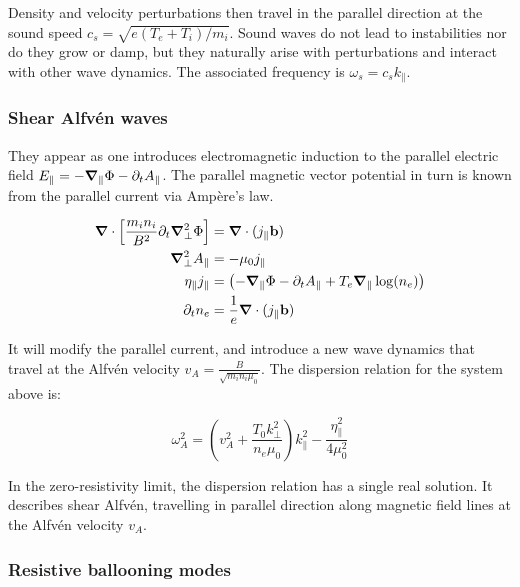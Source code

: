 Density and velocity perturbations then travel in the parallel direction at the sound speed $ c_s = \sqrt{e(T_e + T_i)/m_i} $. Sound waves do not lead to instabilities nor do they grow or damp, but they naturally arise with perturbations and interact with other wave dynamics. The associated frequency is $\omega_s = c_s k_\parallel$.


\subsubsection{Shear Alfvén waves}
\label{ssec:edge_shearAlfvenWaves}

They appear as one introduces electromagnetic induction to the parallel electric field $E_\parallel = -\grad_\parallel \Phi - \partial_t A_\parallel$. The parallel magnetic vector potential in turn is known from the parallel current via Ampère's law.

\begin{align}
	\grad\cdot\left[\frac{m_i n_i}{ B^2}\partial_t\grad^2_\perp\Phi\right] &= \grad\cdot(j_\parallel\mathbf{b}) \\
	\grad^2_\perp A_\parallel &= -\mu_0j_\parallel \\
	\eta_\parallel j_\parallel &= \left(-\grad_\parallel\Phi - \partial_t A_\parallel + T_e\grad_\parallel\log(n_e)\right) \\
	\partial_t n_e &= \frac{1}{e}\grad\cdot (j_\parallel\mathbf{b}) 
	\label{eq:fourFieldModel}
\end{align}

It will modify the parallel current, and introduce a new wave dynamics that travel at the Alfvén velocity $v_A = \frac{B}{\sqrt{m_in_i\mu_0}}$. The dispersion relation for the system above is:

\begin{equation}
	\label{eq:dispersionRelation}
	\omega_A^2 = \left(v_A^2 + \frac{T_0 k_\perp^2}{n_e \mu_0}\right) k_\parallel^2 - \frac{\eta_\parallel^2}{4\mu_0^2}
\end{equation}

In the zero-resistivity limit, the dispersion relation has a single real solution. It describes shear Alfvén, travelling in parallel direction along magnetic field lines at the Alfvén velocity $v_A$.


\subsubsection{Resistive ballooning modes}

